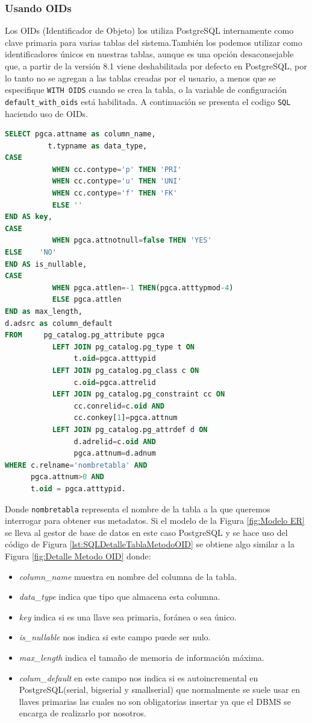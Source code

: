 \subsubsection{Usando OIDs}
Los OIDs (Identificador de Objeto) los utiliza PostgreSQL internamente como clave primaria para varias tablas del sistema.Tambi\'en los podemos utilizar como identificadores \'unicos en nuestras tablas, aunque es una opci\'on desaconsejable que, a partir de la versi\'on 8.1 viene deshabilitada por defecto en PostgreSQL, por lo tanto no se agregan a las tablas creadas por el usuario, a menos que se especifique \texttt{WITH OIDS} cuando se crea la tabla, o la variable de configuraci\'on \texttt{default\_with\_oids} est\'a habilitada.
A continuaci\'on se presenta el codigo \texttt{SQL} haciendo uso de OIDs.
\begin{lstlisting}[caption={Query para obtener detalle tabla con OIDs},label={lst:SQLDetalleTablaMetodoOID},language=sql]
SELECT pgca.attname as column_name,
	      t.typname as data_type,
CASE
		   WHEN cc.contype='p' THEN 'PRI'
		   WHEN cc.contype='u' THEN 'UNI'
		   WHEN cc.contype='f' THEN 'FK'
		   ELSE '' 
END AS key,	
CASE 
		   WHEN pgca.attnotnull=false THEN 'YES' 
ELSE    'NO' 
END AS is_nullable,
CASE 
		   WHEN pgca.attlen=-1 THEN(pgca.atttypmod-4) 
		   ELSE pgca.attlen 
END as max_length,
d.adsrc as column_default
FROM	 pg_catalog.pg_attribute pgca
		   LEFT JOIN pg_catalog.pg_type t ON
			    t.oid=pgca.atttypid
		   LEFT JOIN pg_catalog.pg_class c ON
			    c.oid=pgca.attrelid
		   LEFT JOIN pg_catalog.pg_constraint cc ON 
			    cc.conrelid=c.oid AND 
			    cc.conkey[1]=pgca.attnum
		   LEFT JOIN pg_catalog.pg_attrdef d ON
			    d.adrelid=c.oid AND 
			    pgca.attnum=d.adnum
WHERE c.relname='nombretabla' AND
	  pgca.attnum>0 AND
	  t.oid = pgca.atttypid.
\end{lstlisting}
Donde \texttt{nombretabla} representa el nombre de la tabla a la que queremos interrogar para obtener sus metadatos.
Si el modelo de la Figura \ref{fig:Modelo ER} se lleva al gestor de base de datos en este caso PostgreSQL y  se hace uso del c\'odigo de Figura \ref{lst:SQLDetalleTablaMetodoOID} se obtiene algo similar a la Figura \ref{fig:Detalle Metodo OID} donde:
\begin{itemize}
\item \emph{column\_name} muestra en nombre del columna de la tabla.
\item \emph{data\_type} indica que tipo que almacena esta columna.
\item \emph{key} indica si es una llave sea primaria, for\'anea o sea \'unico.
\item \emph{is\_nullable} nos indica si este campo puede ser nulo.
\item \emph{max\_length} indica el tama\~no de memoria de informaci\'on m\'axima.
\item \emph{colum\_default} en este campo nos indica si es autoincremental en PostgreSQL(serial, bigserial y smallserial) que normalmente se suele usar en llaves primarias las cuales no son obligatorias insertar ya que el DBMS se encarga de realizarlo por nosotros.
\end{itemize}

